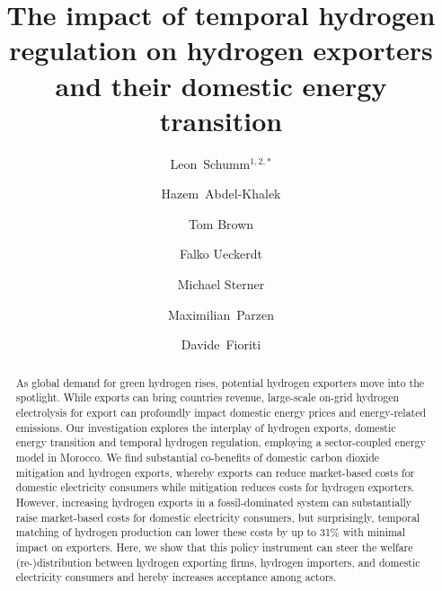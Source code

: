 \documentclass[5p,numafflabel]{elsarticle}
\begin{document}
\begin{frontmatter}

	\title{The impact of temporal hydrogen regulation on hydrogen exporters and their domestic energy transition}

    
    \author{Leon~Schumm${}^{1,2,*}$}
	\author[ieg,alu,oet]{Hazem~Abdel-Khalek}
	\author[tub]{Tom Brown}
	\author[pik]{Falko Ueckerdt}
	\author[oth]{Michael Sterner}
	\author[oet,uoe]{Maximilian~Parzen}
	\author[unipi]{Davide~Fioriti}

	\address[oth]{Research Center on Energy Transmission and Storage (FENES), Faculty of Electrical and Information Technology, University of Applied Sciences (OTH) Regensburg, Seybothstr. 2, 93053 Regensburg, Germany}
	\address[tub]{Department of Digital Transformation in Energy Systems, Technische Universität Berlin, Einsteinufer 25 (TA 8), 10587 Berlin, Germany}
	\address[ieg]{Fraunhofer Research Institution for Energy Infrastructures and Geothermal Systems IEG, Gulbener Straße 23, 03046 Cottbus, Germany}
	\address[alu]{Albert-Ludwigs Universität Freiburg, Faculty of Environment and Natural Resources, Tennenbacher Str. 4, 79106 Freiburg im Breisgau, Germany}
	\address[oet]{Open Energy Transition, Königsallee 52, 95448 Bayreuth, Germany}
	\address[pik]{Potsdam Institute for Climate Impact Research, Telegrafenberg, 14473 Potsdam, Germany}
	\address[uoe]{University of Edinburgh, Institute for Energy Systems, EH9 3DW Edinburgh, United Kingdom}
	\address[unipi]{University of Pisa, Department of Energy Systems, Territory and Construction Engineering, Largo Lucio Lazzarino, 56122 Pisa, Italy}

	\address{${}^{*}$ Corresponding author. Email: leon1.schumm@oth-regensburg.de}

	\begin{abstract}
		
As global demand for green hydrogen rises, potential hydrogen exporters move into the spotlight.
While exports can bring countries revenue, large-scale on-grid hydrogen electrolysis for export can profoundly impact domestic energy prices and energy-related emissions.
Our investigation explores the interplay of hydrogen exports, domestic energy transition and temporal hydrogen regulation, employing a sector-coupled energy model in Morocco. 
We find substantial co-benefits of domestic carbon dioxide mitigation and hydrogen exports, whereby exports can reduce market-based costs for domestic electricity consumers while mitigation reduces costs for hydrogen exporters.
However, increasing hydrogen exports in a fossil-dominated system can substantially raise market-based costs for domestic electricity consumers, but surprisingly, temporal matching of hydrogen production can lower these costs by up to 31\% with minimal impact on exporters.
Here, we show that this policy instrument can steer the welfare (re-)distribution between hydrogen exporting firms, hydrogen importers, and domestic electricity consumers and hereby increases acceptance among actors.


\end{abstract}
\end{frontmatter}
\end{document}

